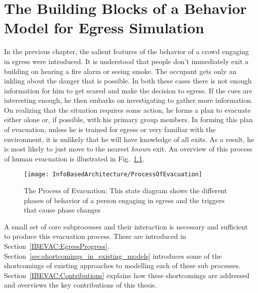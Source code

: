 
\chapter{The Building Blocks of a Behavior Model for Egress Simulation}
\label{chapter:IBEVAC}

In the previous chapter, the salient features of the behavior of a crowd engaging in egress were introduced. It is understood that people don't immediately exit a building on hearing a fire alarm or seeing smoke. The occupant gets only an inkling about the danger that is possible. In both these cases there is not enough information for him to get scared and make the decision to egress. If the cues are interesting enough, he then embarks on investigating to gather more information. On realizing that the situation requires some action, he forms a plan to evacuate either alone or, if possible, with his primary group members. In forming this plan of evacuation, unless he is trained for egress or very familiar with the environment, it is unlikely that he will have knowledge of all exits. As a result, he is most likely to just move to the nearest \emph{known} exit. An overview of this process of human evacuation is illustrated in Fig.~\ref{fig:EvacuationProcess}.

\begin{figure}[!htb]
\centering
\texttt{[image: InfoBasedArchitecture/ProcessOfEvacuation]}
\caption[The Process of Evacuation]{The Process of Evacuation: This state diagram shows the different phases of behavior of a person engaging in egress and the triggers that cause phase changes}
\label{fig:EvacuationProcess}
\end{figure}


A small set of core subprocesses and their interaction is necessary and sufficient to produce this evacuation process. These are introduced in Section~\ref{IBEVAC:EgressProgress}. Section~\ref{sec:shortcomings_in_existing_models} introduces some of the shortcomings of existing approaches to modelling each of these sub processes. Section~\ref{IBEVAC:Contributions} explains how these shortcomings are addressed and overviews the key contributions of this thesis.





